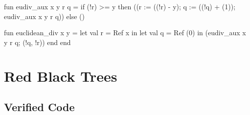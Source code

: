\begin{cakeml}
fun eudiv_aux x y r q =
  if (!r) >= y
  then ((r := ((!r) - y); q := ((!q) + (1)); eudiv_aux x y r q))
  else ()

fun euclidean_div x y =
  let val r = Ref x in
  let val q = Ref (0) in (eudiv_aux x y r q; (!q, !r)) 
    end end
\end{cakeml}

\section{Red Black Trees}

\subsection{Verified \whyml Code}
\label{subsec:Red_Black_Trees_Whyml_Og}

